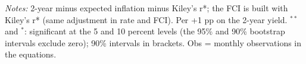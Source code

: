 \begin{flushleft}\footnotesize\textit{Notes:} 2-year minus expected inflation minus Kiley's r*; the FCI is built with Kiley's r* (same adjustment in rate and FCI). Per +1 pp on the 2-year yield. $^{**}$ and $^{*}$: significant at the 5 and 10 percent levels (the 95\% and 90\% bootstrap intervals exclude zero); 90\% intervals in brackets. Obs = monthly observations in the equations.\end{flushleft}
\endgroup
